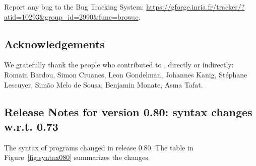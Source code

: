 \documentclass[a4paper,11pt,twoside,openright]{memoir}
\begin{document}
Report any bug to the \why Bug Tracking System:
\url{https://gforge.inria.fr/tracker/?atid=10293&group_id=2990&func=browse}.


\subsection*{Acknowledgements}

We gratefully thank the people who contributed to \why, directly or
indirectly: Romain Bardou, Simon Cruanes, Leon Gondelman, Johannes Kanig,
St\'ephane Lescuyer, Sim\~ao Melo de Sousa, Benjamin Monate, Asma Tafat.

\subsection*{Release Notes for version 0.80: syntax changes w.r.t. 0.73}

The syntax of \whyml programs changed in release 0.80. 
The table in Figure~\ref{fig:syntax080} summarizes the changes.
\end{document}
